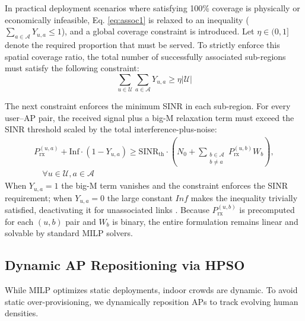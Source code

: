 \documentclass[conference]{IEEEtran}
\begin{document}
	In practical deployment scenarios where satisfying 100\% coverage is physically or economically infeasible, Eq. \eqref{eq:assoc1} is relaxed to an inequality ($\sum_{a \in \mathcal{A}} Y_{u,a} \le 1$), and a global coverage constraint is introduced. Let $\eta \in (0,1]$ denote the required proportion that must be served. To strictly enforce this spatial coverage ratio, the total number of successfully associated sub-regions must satisfy the following constraint:
	\begin{equation}
		\sum_{u \in \mathcal{U}} \sum_{a \in \mathcal{A}} Y_{u,a} \ge \eta |\mathcal{U}|
		\label{eq:coverage_constraint}
	\end{equation}
	
	
	The next constraint enforces the minimum SINR in each sub-region. For every user--AP pair, the received signal plus a big-M relaxation term must exceed the SINR threshold scaled by the total interference-plus-noise:
	\begin{equation}
		\begin{split}
			P_{\text{rx}}^{(u,a)} + \text{Inf} \cdot (1 - Y_{u,a}) \ge \text{SINR}_{\text{th}} \cdot \left( N_0 + \sum_{\substack{b \in \mathcal{A} \\ b \ne a}} P_{\text{rx}}^{(u,b)} W_b \right), \\ 
			\quad \forall u \in \mathcal{U}, a \in \mathcal{A}
		\end{split}
		\label{eq:sinr}
	\end{equation}
	When $Y_{u,a}=1$ the big-M term vanishes and the constraint enforces the SINR requirement; when $Y_{u,a}=0$ the large constant $\textit{Inf}$ makes the inequality trivially satisfied, deactivating it for unassociated links \cite{b4}. Because $P_{\text{rx}}^{(u,b)}$ is precomputed for each $(u,b)$ pair and $W_b$ is binary, the entire formulation remains linear and solvable by standard MILP solvers.
	
	
	\subsection{Dynamic AP Repositioning via HPSO}
	
	While MILP optimizes static deployments, indoor crowds are dynamic. To   
	avoid static over-provisioning, we dynamically reposition APs to track     
	evolving human densities.                                                  
	
\end{document}
